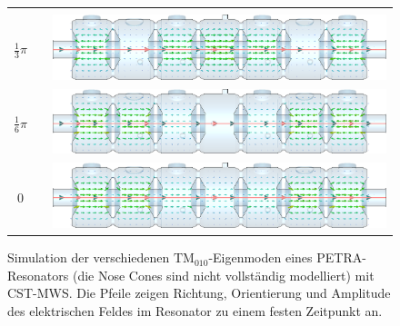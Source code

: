 \begin{figure}[p]
\begin{tabular}{ccc}
\begin{minipage}{0.7\textwidth}
		\end{minipage} \\[3em]
		$\frac{1}{3}\pi$ &&
		\begin{minipage}{0.7\textwidth}
			\vspace{-1mm}
			\includegraphics[width=\textwidth]{./figs/TM010-CST/2_6_pi_cut.png}
		\end{minipage} \\[3em]
		$\frac{1}{6}\pi$ &&
		\begin{minipage}{0.7\textwidth}
			\vspace{-1mm}
			\includegraphics[width=\textwidth]{./figs/TM010-CST/1_6_pi_cut.png}
		\end{minipage} \\[3em]
		$0$ &&
		\begin{minipage}{0.7\textwidth}
			\vspace{-1mm}
			\includegraphics[width=\textwidth]{./figs/TM010-CST/0_cut.png}
		\end{minipage} \\[3em]

	\end{tabular}
	\caption{Simulation der verschiedenen $\mathrm{TM}_{010}$-Eigenmoden eines PETRA-Resonators (die Nose Cones sind nicht vollständig modelliert) mit CST-MWS. Die Pfeile zeigen Richtung, Orientierung und Amplitude des elektrischen Feldes im Resonator zu einem festen Zeitpunkt an.}
	\label{fig:feldverteilung_tm010}
\end{figure}

